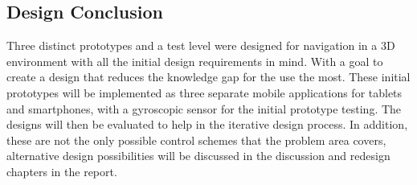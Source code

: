 \subsection{Design Conclusion}
Three distinct prototypes and a test level were designed for navigation in a 3D environment with all the initial design requirements in mind. With a goal to create a design that reduces the knowledge gap for the use the most. These initial prototypes will be implemented as three separate mobile applications for tablets and smartphones, with a gyroscopic sensor for the initial prototype testing. The designs will then be evaluated to help in the iterative design process.
In addition, these are not the only possible control schemes that the problem area covers, alternative design possibilities will be discussed in the discussion and redesign chapters in the report. 
